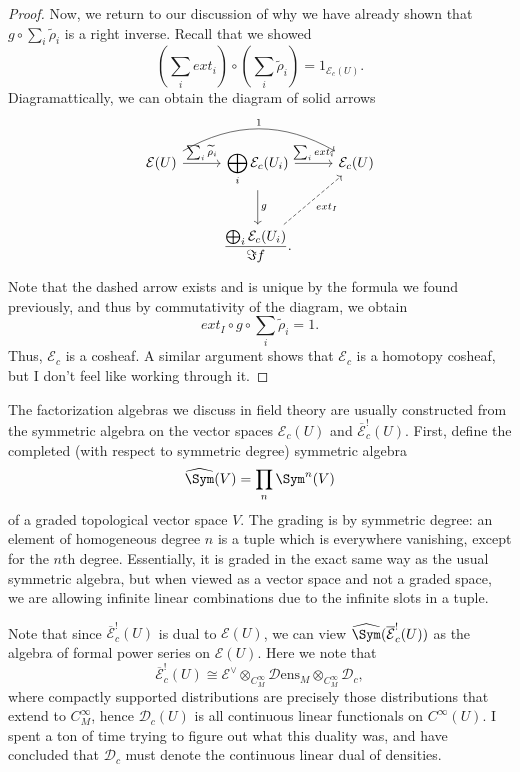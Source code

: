 \begin{proof}
	Now, we return to our discussion of why we have already shown that $g\circ \sum_{i} \widetilde{\rho } _i$ is a right inverse. Recall that we showed
	\[
		\left( \sum_{i} ext_i \right) \circ \left( \sum_{i} \widetilde{\rho } _i \right) =1_{\mathcal{E} _c(U)} 
	.\]
	Diagramattically, we can obtain the diagram of solid arrows
	\[\begin{tikzcd}[row sep = 2.5em, column sep = 2.5em]
		\mathcal{E} (U) \ar[" 1 ", bend left, rr] \ar[" \sum_{i} \widetilde{\rho } _i ", r]  & \displaystyle{\bigoplus_{i} \mathcal{E} _c(U_i)} \ar[" \sum_{i} ext_i ", r] \ar[" g ", d]  & \mathcal{E}_c(U) \\
												     & \displaystyle{\frac{\bigoplus_{i} \mathcal{E} _c(U_i)}{\Im f}} \ar[" ext_I "', dashed,  ur] . & 
	\end{tikzcd}\]
	Note that the dashed arrow exists and is unique by the formula we found previously, and thus by commutativity of the diagram, we obtain
	\[
		ext_I \circ g \circ \sum_{i} \widetilde{\rho } _i = 1
	.\]
	Thus, $\mathcal{E} _c$ is a cosheaf. A similar argument shows that $\mathcal{E} _c$ is a homotopy cosheaf, but I don't feel like working through it.
\end{proof}


The factorization algebras we discuss in field theory are usually constructed from the symmetric algebra on the vector spaces $\mathcal{E} _c(U)$ and $\overline{\mathcal{E} } _c^!(U)$. First, define the completed (with respect to symmetric degree) symmetric algebra
\[
	\widehat{\Sym }(V)= \prod_{n} \Sym ^n(V)
\]
of a graded topological vector space $V$. The grading is by symmetric degree: an element of homogeneous degree $n$ is a tuple which is everywhere vanishing, except for the $n$th degree. Essentially, it is graded in the exact same way as the usual symmetric algebra, but when viewed as a vector space and not a graded space, we are allowing infinite linear combinations due to the infinite slots in a tuple.

Note that since $\overline{\mathcal{E} } _c^!(U)$ is dual to $\mathcal{E} (U)$, we can view $\widehat{\Sym }(\overline{\mathcal{E} } _c^!(U))$ as the algebra of formal power series on $\mathcal{E} (U)$. Here we note that
\[
	\overline{\mathcal{E} } _c^!(U) \cong \mathcal{E}^\vee \otimes _{C^\infty _M} \mathcal{D}\mathrm{ens} _M \otimes_{C^\infty _M} \mathcal{D} _c,
\]
where compactly supported distributions are precisely those distributions that extend to $C^\infty_M$, hence $\mathcal{D} _c(U)$ is all continuous linear functionals on $C^\infty(U)$. I spent a ton of time trying to figure out what this duality was, and have concluded that $\mathcal{D} _c$ must denote the continuous linear dual of densities.

